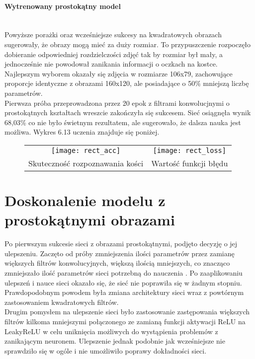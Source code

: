 \paragraph{Wytrenowany prostokątny model} \mbox{}\\
Powyższe porażki oraz wcześniejsze sukcesy na kwadratowych obrazach sugerowały, że
obrazy mogą mieć za duży rozmiar. To przypuszczenie rozpoczęło dobieranie
odpowiedniej rozdzielczości zdjęć tak by rozmiar był mały, a jednocześnie nie powodował
zanikania informacji o oczkach na kostce. Najlepszym wyborem okazały się zdjęcia w rozmiarze 106x79,
zachowujące proporcje identyczne z obrazami 160x120, ale posiadające o 50\% mniejszą liczbę parametrów.\\
Pierwsza próba przeprowadzona przez 20 epok z filtrami konwolucjnymi o prostokątnych
kształtach wreszcie zakończyła się sukcesem. Sieć osiągnęła wynik 68,03\% co nie
było świetnym rezultatem, ale sugerowało, że dalsza nauka jest możliwa. Wykres 6.13 uczenia znajduje się poniżej.\\

\begin{figure}[h!]
\begin{center}
\begin{tabular}{cc}
\texttt{[image: rect\_acc]} &
\texttt{[image: rect\_loss]} \\
 Skuteczność rozpoznawania kości & Wartość funkcji błędu\\
\end{tabular}
\label{fig:rect_learned}
\end{center}
\end{figure}

\section{Doskonalenie modelu z prostokątnymi obrazami}
Po pierwszym sukcesie sieci z obrazami prostokątnymi, podjęto decyzję o jej ulepszeniu.
Zaczęto od próby zmniejszenia ilości parametrów przez zamianę większych filtrów konwolucyjnych,
większą ilością mniejszych, co znacząco zmniejszało ilość parametrów sieci potrzebną do nauczenia \cite{substBigConv}.
Po zaaplikowaniu ulepszeń i nauce sieci okazało się, że sieć nie poprawiła się w żadnym
stopniu. Prawdopodobnym powodem była zmiana architektury sieci wraz z powtórnym
zastosowaniem kwadratowych filtrów.\\
Drugim pomysłem na ulepszenie sieci było zastosowanie zastępowania większych filtrów
kilkoma mniejszymi połączonego ze zamianą funkcji aktywacji ReLU na LeakyReLU w celu uniknięcia
możliwych do wystąpienia problemów z zanikającym neuronem. Ulepszenie jednak podobnie
jak wcześniejsze nie sprawdziło się w ogóle i nie umożliwiło poprawy dokładności sieci.

